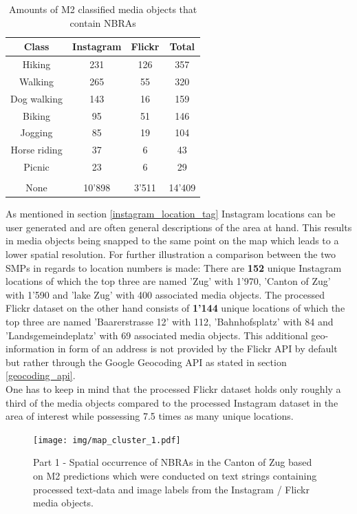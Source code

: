 \begin{table}[h!]
\begin{center}
\caption{Amounts of M2 classified media objects that contain NBRAs}\vspace{1ex}
\label{tab:amount_class_NBRAs}
\begin{tabular}{cccc}\hline
Class & Instagram & Flickr & Total\\ \hline
Hiking & 231 & 126 & 357\\
Walking & 265 & 55 & 320\\
Dog walking & 143 & 16 & 159\\
Biking & 95 & 51 & 146\\
Jogging & 85 & 19 & 104\\
Horse riding & 37 & 6 & 43\\
Picnic & 23 & 6 & 29\\
 & & & \\
None & 10'898 & 3'511 & 14'409\\
\hline
\end{tabular}
\end{center}
\end{table}

As mentioned in section \ref{instagram_location_tag} Instagram locations can be user generated and are often general descriptions of the area at hand. This results in media objects being snapped to the same point on the map which leads to a lower spatial resolution. For further illustration a comparison between the two SMPs in regards to location numbers is made:
There are \textbf{152} unique Instagram locations of which the top three are named 'Zug' with 1'970, 'Canton of Zug' with 1'590 and 'lake Zug' with 400 associated media objects.
The processed Flickr dataset on the other hand consists of \textbf{1'144} unique locations of which the top three are named 'Baarerstrasse 12' with 112, 'Bahnhofsplatz' with 84 and 'Landsgemeindeplatz' with 69 associated media objects. This additional geo-information in form of an address is not provided by the Flickr API by default but rather through the Google Geocoding API as stated in section \ref{geocoding_api}. \\
One has to keep in mind that the processed Flickr dataset holds only roughly a third of the media objects compared to the processed Instagram dataset in the area of interest while possessing 7.5 times as many unique locations. 

\begin{figure}[h!]
   \centering
   \texttt{[image: img/map\_cluster\_1.pdf]}
   \caption{Part 1 - Spatial occurrence of NBRAs in the Canton of Zug based on M2 predictions
which were conducted on text strings containing processed text-data and image labels from
the Instagram / Flickr media objects.}
   \label{fig:map_cluster_1}
\end{figure}

